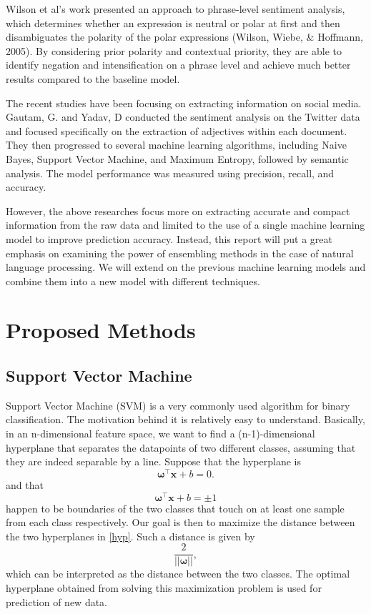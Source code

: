 \documentclass[10pt,twocolumn]{article}
\begin{document}
	Wilson et al’s work presented an approach to phrase-level sentiment analysis, which determines whether an expression is neutral or polar at first and then disambiguates the polarity of the polar expressions (Wilson, Wiebe, \& Hoffmann, 2005)\cite{wilson-etal-2005-recognizing}.  By considering prior polarity and contextual priority, they are able to identify negation and intensification on a phrase level and achieve much better results compared to the baseline model.

	The recent studies have been focusing on extracting information on social media. Gautam, G. and Yadav, D conducted the sentiment analysis on the Twitter data and focused specifically on the extraction of adjectives within each document\cite{6897213}. They then progressed to several machine learning algorithms, including Naive Bayes, Support Vector Machine, and Maximum Entropy, followed by semantic analysis. The model performance was measured using precision, recall, and accuracy.
	
	However, the above researches focus more on extracting accurate and compact information from the raw data and limited to the use of a single machine learning model to improve prediction accuracy. Instead, this report will put a great emphasis on examining the power of ensembling methods in the case of natural language processing. We will extend on the previous machine learning models and combine them into a new model with different techniques.

	\section{Proposed Methods}
	\subsection{Support Vector Machine}
	Support Vector Machine (SVM) is a very commonly used algorithm for binary classification. The motivation behind it is relatively easy to understand. Basically, in an n-dimensional feature space, we want to find a (n-1)-dimensional hyperplane that separates the datapoints of two different classes, assuming that they are indeed separable by a line. Suppose that the hyperplane is $$\bm{\omega}^\top \bm{x} + b = 0.$$ and that \begin{equation}
	\bm{\omega}^\top \bm{x} + b = \pm1 \label{hyp}
	\end{equation} happen to be boundaries of the two classes that touch on at least one sample from each class respectively. Our goal is then to maximize the distance between the two hyperplanes in \ref{hyp}. Such a distance is given by $$\frac{2}{||\bm{\omega}||},$$ which can be interpreted as the distance between the two classes. The optimal hyperplane obtained from solving this maximization problem is used for prediction of new data. 
	
\end{document}
